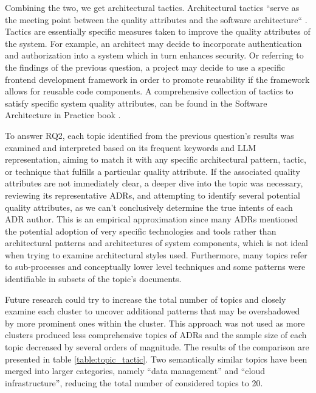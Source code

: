         Combining the two, we get architectural tactics. Architectural tactics ``serve as the
        meeting point between the quality attributes and the software architecture`` \cite{patters+quality_requirements+tactics}. Tactics are essentially specific measures taken to improve the quality attributes of the system. For example, an architect may decide to incorporate authentication and authorization into a system which in turn enhances security. Or referring to the findings of the previous question, a project may decide to use a specific frontend development framework in order to promote reusability if the framework allows for reusable code components. A comprehensive collection of tactics to satisfy specific system quality attributes, can be found in the Software Architecture in Practice book \cite{software_arch_in_practice_book}. 
        
        To answer RQ2, each topic identified from the previous question's results was examined and interpreted based on its frequent keywords and LLM representation, aiming to match it with any specific architectural pattern, tactic, or technique that fulfills a particular quality attribute. If the associated quality attributes are not immediately clear, a deeper dive into the topic was necessary, reviewing its representative ADRs, and attempting to identify several potential quality attributes, as we can't conclusively determine the true intents of each ADR author. This is an empirical approximation since many ADRs mentioned the potential adoption of very specific technologies and tools rather than architectural patterns and architectures of system components, which is not ideal when trying to examine architectural styles used. Furthermore, many topics refer to sub-processes and conceptually lower level techniques and some patterns were identifiable in subsets of the topic's documents.
        
        Future research could try to increase the total number of topics and closely examine each cluster to uncover additional patterns that may be overshadowed by more prominent ones within the cluster. This approach was not used as more clusters produced less comprehensive topics of ADRs and the sample size of each topic decreased by several orders of magnitude. The results of the comparison are presented in table \ref{table:topic_tactic}. Two semantically similar topics have been merged into larger categories, namely ``data management'' and ``cloud infrastructure'', reducing the total number of considered topics to 20.

